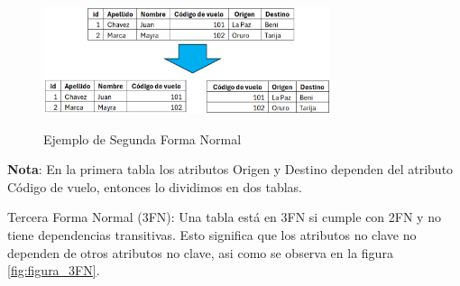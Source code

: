 		\vspace{0.3cm} %
		
		\begin{figure}[!h] %
			\caption[Ejemplo Segunda Forma Normal]
			{\newline Ejemplo de Segunda Forma Normal} %
			\vspace{0.2cm}
			\centering
			\includegraphics[width=0.75\textwidth]{imagenes/normalizacion/2FN.png} %
			\vspace{-0.6cm}
			\label{fig:figura_2FN} %
		\end{figure}
		
		\begin{adjustwidth}{1.27cm}{1.27cm}
			\textup{\textbf{Nota}: En la primera tabla los atributos Origen y Destino dependen del atributo Código de vuelo, entonces lo dividimos en dos tablas.}
		\end{adjustwidth}
		
		Tercera Forma Normal (3FN): Una tabla está en 3FN si cumple con 2FN y no tiene dependencias transitivas. Esto significa que los atributos no clave no dependen de otros atributos no clave, asi como se observa en la figura \ref{fig:figura_3FN}.
		
		\vspace{0.3cm} %
		
